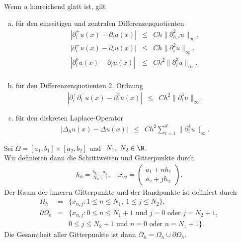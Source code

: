 \begin{Bemerkung}
    Wenn $u$ hinreichend glatt ist, gilt
    \begin{enumerate}[a)]
	\item
	    für den einseitigen und zentralen Differenzenquotienten
	    \begin{eqnarray*}
                |\partial_i^+ u(x) - \partial_i u(x)|
            &\le& Ch \|\partial_{h, i}^2 u\|_\infty, \\
                |\partial_i^- u(x) - \partial_i u(x)|
            &\le& Ch \|\partial_i^2 u\|_\infty, \\
                |\partial_i^0 u(x) - \partial_i u(x)|
            &\le& Ch^2 \|\partial_i^3 u\|_\infty. \\
	    \end{eqnarray*}
	\item
	    für den Differenzenquotienten 2. Ordnung
	    \begin{eqnarray*}
                |\partial_i^+\partial_i^- u(x) -
                \partial_i^2 u(x)|
            &\le& Ch^2 \|\partial_i^4 u\|_\infty.
	    \end{eqnarray*}
	\item
	    für den diskreten Laplace-Operator
	    \begin{eqnarray*}
                |\Delta_h u(x) - \Delta u(x)|
            &\le& Ch^2 \sum_{i=1}^d \|\partial_i^4 u\|_\infty.
	    \end{eqnarray*}
    \end{enumerate}
\end{Bemerkung}


\begin{Kartesische Gitter in 2-d}
    Sei $\Omega = [a_1, b_1] \times [a_2, b_2]$ und $\ N_1, \ N_2\in \N$. \\
    Wir definieren dann die Schrittweiten und Gitterpunkte durch
    \begin{eqnarray*}
        h_k = \frac{b_k - a_k}{N_k + 1}, \quad
        x_{n j} =	\begin{pmatrix}
                        a_1 + n h_1 \\
                        a_2 + j h_2
                    \end{pmatrix}.
    \end{eqnarray*}
    Der Raum der inneren Gitterpunkte und der Randpunkte ist definiert
    durch
    \begin{eqnarray*}
            \Omega_h
        &=& \{x_{n, j} \colon 1 \le n \le N_1, \ 1 \le j \le N_2\}, \\
            \partial\Omega_h
        &=& \{x_{n, j} \colon 0 \le n \le N_1 + 1 \text{ und } j = 0
            \text{ oder } j = N_2 + 1, \\
            && 0 \le j \le N_2 + 1 \text{ und } n = 0 \text{ oder }
            n = N_1 + 1\}.
    \end{eqnarray*}
    Die Gesamtheit aller Gitterpunkte ist dann
    $\overline\Omega_h = \Omega_h \cup \partial\Omega_h$.
\end{Kartesische Gitter in 2-d}


